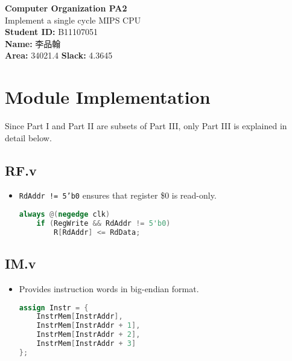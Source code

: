\documentclass[12pt]{article}
\begin{document}
\kaishu

\begin{titlepage}
    \thispagestyle{empty}
    \vspace*{\fill} %
    \begin{center}
        \LARGE\textbf{Computer Organization PA2} \\[1.0em]
        \Large Implement a single cycle MIPS CPU \\[2.0em]
        \normalsize
        \textbf{Student ID:} B11107051 \\[0.5em]
        \textbf{Name:} 李品翰 \\[0.5em]
        \textbf{Area:} 34021.4 \quad
        \textbf{Slack:} 4.3645 \\[2em]
    \end{center}
    \vspace*{\fill} %
\end{titlepage}


\section{Module Implementation}

Since Part I and Part II are subsets of Part III, only Part III is explained in detail below.

\subsection{RF.v}
\begin{itemize}
    \item \texttt{RdAddr != 5'b0} ensures that register \$0 is read-only.
    \begin{lstlisting}[language=Verilog]
always @(negedge clk)
    if (RegWrite && RdAddr != 5'b0) 
        R[RdAddr] <= RdData;
    \end{lstlisting}
\end{itemize}

\subsection{IM.v}
\begin{itemize}
    \item Provides instruction words in big-endian format.
    \begin{lstlisting}[language=Verilog]
assign Instr = {
    InstrMem[InstrAddr],
    InstrMem[InstrAddr + 1],
    InstrMem[InstrAddr + 2],
    InstrMem[InstrAddr + 3]
};
    \end{lstlisting}
\end{itemize}
\end{document}
